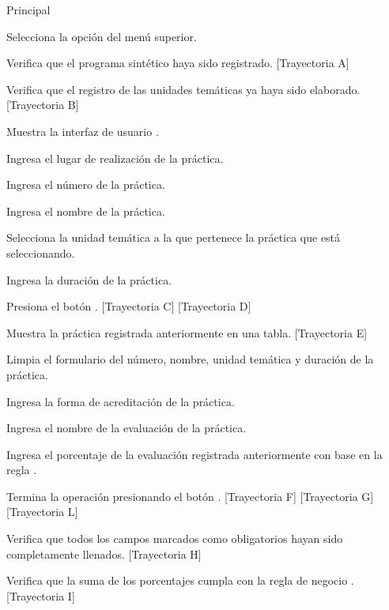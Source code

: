 \begin{UCtrayectoria}{Principal}

    \UCpaso[\UCactor] Selecciona la opción  del menú superior.
    
    \UCpaso Verifica que el programa sintético haya sido registrado. [Trayectoria A]
    
    \UCpaso Verifica que el registro de las unidades temáticas ya haya sido elaborado. [Trayectoria B]
    
    \UCpaso Muestra la interfaz de usuario .
    
    \UCpaso[\UCactor] Ingresa el lugar de realización de la práctica.
    
    \UCpaso[\UCactor] Ingresa el número de la práctica. 
    
    \UCpaso[\UCactor] Ingresa el nombre de la práctica.
    
    \UCpaso[\UCactor] Selecciona la unidad temática a la que pertenece la práctica que está seleccionando.
    
    \UCpaso[\UCactor] Ingresa la duración de la práctica.
    
    \UCpaso[\UCactor] Presiona el botón . [Trayectoria C] [Trayectoria D]
    
    \UCpaso Muestra la práctica registrada anteriormente en una tabla. [Trayectoria E]
    
    \UCpaso Limpia el formulario del número, nombre, unidad temática y duración de la práctica.
    
    \UCpaso[\UCactor] Ingresa la forma de acreditación de la práctica.
    
    \UCpaso[\UCactor] Ingresa el nombre de la evaluación de la práctica.
    
    \UCpaso[\UCactor] Ingresa el porcentaje de la evaluación registrada anteriormente con base en la regla .
    
    \UCpaso[\UCactor] Termina la operación presionando el botón . [Trayectoria F] [Trayectoria G] [Trayectoria L]
    
    \UCpaso Verifica que todos los campos marcados como obligatorios hayan sido completamente llenados. [Trayectoria H]
    
    \UCpaso Verifica que la suma de los porcentajes cumpla con la regla de negocio . [Trayectoria I]
    

\end{UCtrayectoria}
